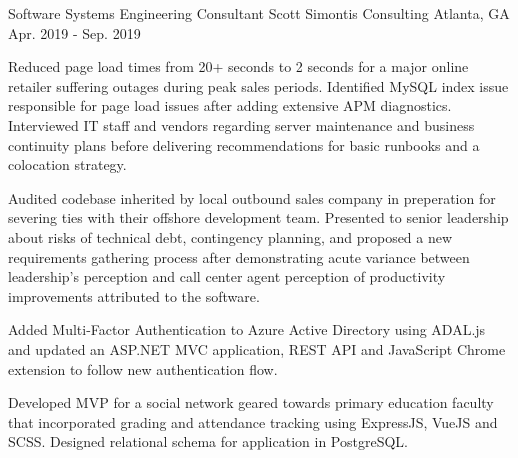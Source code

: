 \begin{cventries}
  \cventry
    {Software Systems Engineering Consultant} %
    {Scott Simontis Consulting} %
    {Atlanta, GA} %
    {Apr. 2019 - Sep. 2019} %
    {
      \begin{cvitems} %
        \item {Reduced page load times from 20+ seconds to 2 seconds for a major online retailer suffering outages during peak sales periods. Identified MySQL index issue responsible for page load issues after adding extensive APM diagnostics. Interviewed IT staff and vendors regarding server maintenance and business continuity plans before delivering recommendations for basic runbooks and a colocation strategy.}
        \item {Audited codebase inherited by local outbound sales company in preperation for severing ties with their offshore development team. Presented to senior leadership about risks of technical debt, contingency planning, and proposed a new requirements gathering process after demonstrating acute variance between leadership's perception and call center agent perception of productivity improvements attributed to the software.}
        \item {Added Multi-Factor Authentication to Azure Active Directory using ADAL.js and updated an ASP.NET MVC application, REST API and JavaScript Chrome extension to follow new authentication flow.}
        \item {Developed MVP for a social network geared towards primary education faculty that incorporated grading and attendance tracking using ExpressJS, VueJS and SCSS. Designed relational schema for application in PostgreSQL.}
      \end{cvitems}
    }


\end{cventries}
